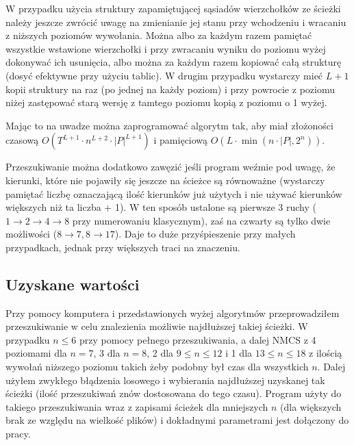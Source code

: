 \documentclass{pracamgr}
\begin{document}
     W przypadku użycia struktury zapamiętującej sąsiadów wierzchołków ze ścieżki należy jeszcze zwrócić uwagę na zmienianie jej stanu przy wchodzeniu
     i wracaniu z niższych poziomów wywołania. Można albo za każdym razem pamiętać wszystkie wstawione wierzchołki i przy zwracaniu wyniku
     do poziomu wyżej dokonywać ich usunięcia, albo można za każdym razem kopiować całą strukturę (dosyć efektywne przy użyciu tablic).
     W drugim przypadku wystarczy mieć $L+1$ kopii struktury na raz (po jednej na każdy poziom) i przy powrocie z poziomu niżej
     zastępować starą wersję z tamtego poziomu kopią z poziomu o 1 wyżej.
     
     Mając to na uwadze można zaprogramować algorytm tak, aby miał złożoności czasową $O(T^{L+1}\cdot n^{L+2}\cdot|P|^{L+1})$
     i pamięciową $O(L\cdot \min(n\cdot |P|,2^n))$.\newline
     
     Przeszukiwanie można dodatkowo zawęzić jeśli program weźmie pod uwagę, że kierunki, które nie pojawiły się jeszcze na ścieżce są równoważne
     (wystarczy pamiętać liczbę oznaczającą ilość kierunków już użytych i nie używać kierunków większych niż ta liczba + 1).
     W ten sposób ustalone są pierwsze 3 ruchy ($1\rightarrow2\rightarrow4\rightarrow8$ przy numerowaniu klasycznym),
     zaś na czwarty są tylko dwie możliwości ($8\rightarrow7,8\rightarrow17$). Daje to duże przyśpieszenie przy małych przypadkach,
     jednak przy większych traci na znaczeniu.
    \subsection{Uzyskane wartości}
     Przy pomocy komputera i przedstawionych wyżej algorytmów przeprowadziłem przeszukiwanie w celu znalezienia możliwie najdłuższej takiej ścieżki.
     W przypadku $n\le6$ przy pomocy pełnego przeszukiwania, a dalej NMCS z 4 poziomami dla $n=7$, 3 dla $n=8$, 2 dla $9\le n\le12$ i 1 dla $13\le n\le18$
     z ilością wywołań niższego poziomu takich żeby podobny był czas dla wszystkich $n$. Dalej użyłem zwykłego błądzenia losowego i wybierania najdłuższej
     uzyskanej tak ścieżki (ilość przeszukiwań znów dostosowana do tego czasu).
     Program użyty do takiego przeszukiwania wraz z zapisami ścieżek dla mniejszych $n$ (dla większych brak ze względu na wielkość plików)
     i dokładnymi parametrami jest dołączony do pracy.\newline
     
\end{document}
